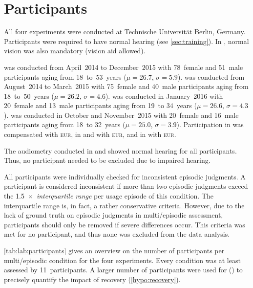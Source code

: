 \section{Participants}
All four experiments were conducted at Technische Universität Berlin, Germany.
Participants were required to have normal hearing (see \autoref{sec:training}).
In \EIIb{}, normal vision was also mandatory (vision aid allowed).

 was conducted from April~2014 to December~2015 with 78~female and 51~male participants aging from 18~to~53~years (${\mu=26.7}$, ${\sigma=5.9}$). %
\EIIa{} was conducted from August~2014 to March~2015 with 75~female and 40~male participants aging from 18~to~50~years (${\mu=26.2}$, ${\sigma=4.6}$).
\EIIb{} was conducted in January~2016 with 20~female and 13~male participants aging from 19~to 34~years (${\mu=26.6}$, ${\sigma=4.3}$). 
 was conducted in October and November~2015 with 20~female and 16~male participants aging from 18~to 32~years (${\mu=25.0}$, ${\sigma=3.9}$).
Participation in  was compensated with \unit[20]{\textsc{\lowercase{EUR}}}, in \EIIa{} and  with \unit[10]{\textsc{\lowercase{EUR}}}, and in \EIIb{} with \unit[15]{\textsc{\lowercase{EUR}}}.

The audiometry conducted in  and \EIIa{} showed normal hearing for all participants.
Thus, no participant needed to be excluded due to impaired hearing.

All participants were individually checked for inconsistent episodic judgments.
A participant is considered inconsistent if more than two episodic judgments exceed the 1.5~$\times$~\emph{interquartile range} per usage episode of this condition.
The interquartile range is, in fact, a rather conservative criteria.
However, due to the lack of ground truth on episodic judgments in multi\-/episodic assessment, participants should only be removed if severe differences occur.
This criteria was met for no participant, and thus none was excluded from the data analysis.

\autoref{tab:lab:participants} gives an overview on the number of participants per multi\-/episodic condition for the four experiments.
Every condition was at least assessed by 11~participants.
A larger number of participants were used for  () to precisely quantify the impact of recovery (\autoref{hypo:recovery}).

